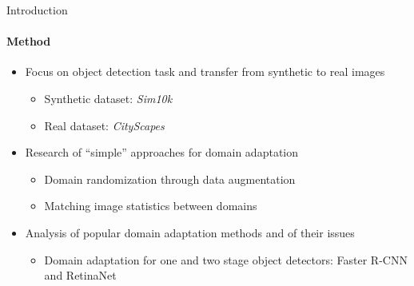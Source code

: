 \documentclass[aspectratio=141]{beamer}
\newcommand{\quotes}[1]{``#1''}
\begin{document}
\begin{frame}{Introduction}
    \framesubtitle{Method}
    
    \begin{itemize}
    	\item Focus on \alert{object detection} task and transfer from synthetic to real images
    	\begin{itemize}
    		\item Synthetic dataset: \alert{\textit{Sim10k}}
    		\item Real dataset: \alert{\textit{CityScapes}}
    	\end{itemize}
    	\vspace*{4mm}
    	\item Research of \quotes{simple} approaches for domain adaptation
    	\begin{itemize}
    		\item Domain randomization through data augmentation
    		\item Matching image statistics between domains
    	\end{itemize}
	    \vspace*{4mm}
    	\item Analysis of popular domain adaptation methods and of their issues
    	\begin{itemize}
    	    \item Domain adaptation for one and two stage object detectors: Faster R-CNN and RetinaNet
    	\end{itemize}
    \end{itemize}
\end{frame}
\end{document}
